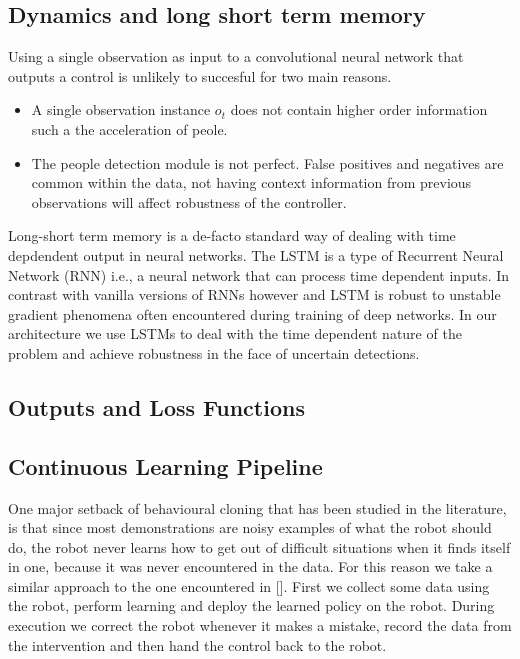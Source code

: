 \documentclass[letterpaper, 10 pt, conference]{ieeeconf}
\begin{document}
\subsection{Dynamics and long short term memory}
Using a single observation as input to a convolutional neural network that outputs a control is unlikely to succesful for two main reasons.

\begin{itemize}
\item A single observation instance $o_t$ does not contain higher order information such a the acceleration of peole.
\item The people detection module is not perfect. False positives and negatives are common within the data, not having context information from previous observations will affect robustness of the controller.
\end{itemize}

Long-short term memory is a de-facto standard way of dealing with time depdendent output in neural networks. The LSTM is a type of Recurrent Neural Network (RNN) i.e., a neural network that can process time dependent inputs. In contrast with vanilla versions of RNNs however and LSTM is robust to unstable gradient phenomena often encountered during training of deep networks. In our architecture we use LSTMs to deal with the time dependent nature of the problem and achieve robustness in the face of uncertain detections.



\subsection{Outputs and Loss Functions}


\subsection{Continuous Learning Pipeline}
One major setback of behavioural cloning that has been studied in the literature, is that since most demonstrations are noisy examples of what the robot should do, the robot never learns how to get out of difficult situations when it finds itself in one, because it was never encountered in the data. For this reason we take a similar approach to the one encountered in []. First we collect some data using the robot, perform learning and deploy the learned policy on the robot. During execution we correct the robot whenever it makes a mistake, record the data from the intervention and then hand the control back to the robot.
\end{document}
